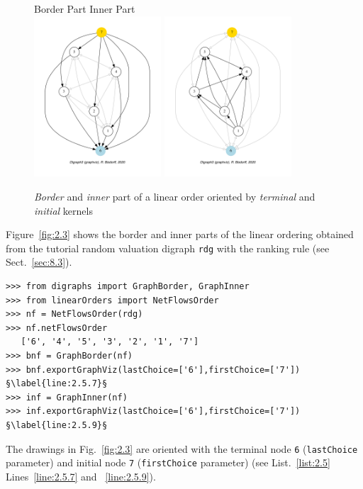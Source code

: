 \begin{figure}[ht]
  Border Part \hfill Inner Part \\
  \includegraphics[height=6cm]{Figures/2-3-linearOrderBorder.pdf}\hfill
  \includegraphics[height=6cm]{Figures/2-3-linearOrderInner.pdf}\hfill
\caption{\emph{Border} and \emph{inner} part of a linear order oriented by \emph{terminal} and \emph{initial} kernels}
\label{fig:2.3}       %
\end{figure}
Figure~\vref{fig:2.3} shows the border and inner parts of the linear ordering obtained from the tutorial random valuation digraph \texttt{rdg}  with the \NetFlows ranking rule  (see Sect.~\ref{sec:8.3}).  
\begin{lstlisting}[caption={Border and inner part of a linear order},label=list:2.5]
>>> from digraphs import GraphBorder, GraphInner
>>> from linearOrders import NetFlowsOrder
>>> nf = NetFlowsOrder(rdg)
>>> nf.netFlowsOrder
   ['6', '4', '5', '3', '2', '1', '7']
>>> bnf = GraphBorder(nf)
>>> bnf.exportGraphViz(lastChoice=['6'],firstChoice=['7']) §\label{line:2.5.7}§
>>> inf = GraphInner(nf)
>>> inf.exportGraphViz(lastChoice=['6'],firstChoice=['7']) §\label{line:2.5.9}§
\end{lstlisting}

The drawings in Fig.~\vref{fig:2.3} are oriented with the terminal node \texttt{6} (\texttt{lastChoice} parameter) and initial node \texttt{7} (\texttt{firstChoice} parameter) (see List.~\vref{list:2.5} Lines~\ref{line:2.5.7} and ~\ref{line:2.5.9}).

